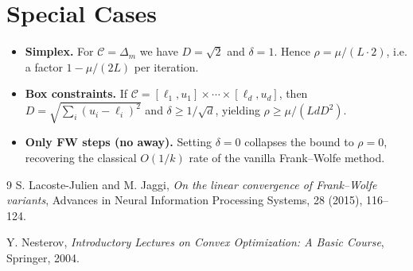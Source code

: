 \documentclass{article}
\begin{document}
\section*{Special Cases}
\begin{itemize}
\item \textbf{Simplex.} For $\mathcal C=\Delta_{m}$ we have $D=\sqrt{2}$ and $\delta=1$.  Hence $\rho=\mu/(L\cdot2)$, i.e. a factor $1-\mu/(2L)$ per iteration.
\item \textbf{Box constraints.} If $\mathcal C=[\ell_1,u_1]\times\cdots\times[\ell_d,u_d]$, then $D=\sqrt{\sum_i (u_i-\ell_i)^2}$ and $\delta\ge 1/\sqrt{d}$, yielding $\rho\ge \mu/(L d D^2)$.
\item \textbf{Only FW steps (no away).} Setting $\delta=0$ collapses the bound to $\rho=0$, recovering the classical $O(1/k)$ rate of the vanilla Frank–Wolfe method.
\end{itemize}

\begin{thebibliography}{9}
S. Lacoste-Julien and M. Jaggi,
\emph{On the linear convergence of Frank–Wolfe variants},
Advances in Neural Information Processing Systems, 28 (2015), 116–124.

Y. Nesterov,
\emph{Introductory Lectures on Convex Optimization: A Basic Course},
Springer, 2004.
\end{thebibliography}
\end{document}
